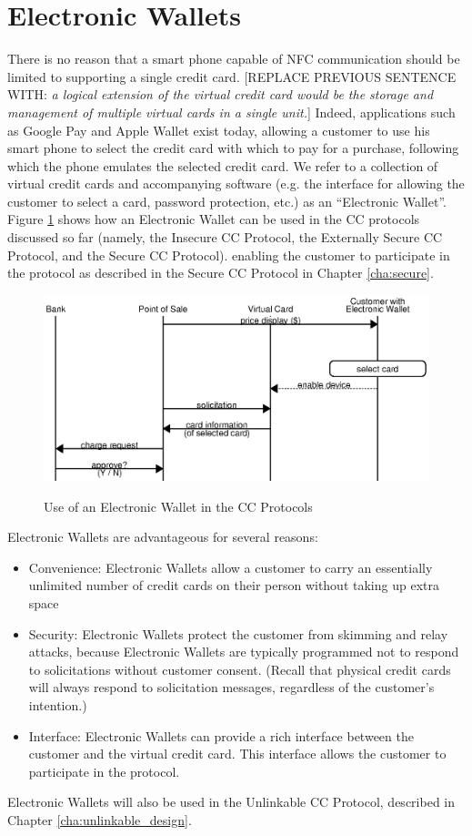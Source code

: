 \section{Electronic Wallets}
There is no reason that a smart phone capable of NFC communication should be limited to supporting a single credit card.
[REPLACE PREVIOUS SENTENCE WITH: \emph{a logical extension of the virtual credit card would be the storage and management of multiple virtual cards in a single unit.}]
Indeed, applications such as Google Pay and Apple Wallet exist today,
    allowing a customer to use his smart phone to select the credit card with which to pay for a purchase,
    following which the phone emulates the selected credit card.
We refer to a collection of virtual credit cards and accompanying software
    (e.g. the interface for allowing the customer to select a card, password protection, etc.) as an ``Electronic Wallet''.
Figure \ref{fig:wallet} shows how an Electronic Wallet can be used in the CC protocols discussed so far
    (namely, the Insecure CC Protocol, the Externally Secure CC Protocol, and the Secure CC Protocol).
    enabling the customer to participate in the protocol as described in the Secure CC Protocol in Chapter \ref{cha:secure}.

\begin{figure}[h!]
  \caption{Use of an Electronic Wallet in the CC Protocols}
  \centering
    \includegraphics{img/wallet.eps}
  \label{fig:wallet}
\end{figure}

Electronic Wallets are advantageous for several reasons:
\begin{itemize}
\item Convenience: Electronic Wallets allow a customer to carry an essentially unlimited number of credit cards on their person without taking up extra space
\item Security: Electronic Wallets protect the customer from skimming and relay attacks,
    because Electronic Wallets are typically programmed not to respond to solicitations without customer consent.
    (Recall that physical credit cards will always respond to solicitation messages, regardless of the customer's intention.)
\item Interface: Electronic Wallets can provide a rich interface between the customer and the virtual credit card.
    This interface allows the customer to participate in the protocol.
\end{itemize}

Electronic Wallets will also be used in the Unlinkable CC Protocol, described in Chapter \ref{cha:unlinkable_design}.